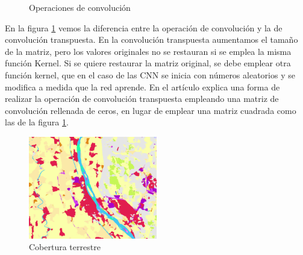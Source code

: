 \begin{figure}[H]
    \centering
    \caption{Operaciones de convolución} \label{fig:operaciones-convolucion} 
\end{figure} 

En la figura \ref{fig:operaciones-convolucion} vemos la diferencia entre la operación de convolución y la de convolución transpuesta.
En la convolución transpuesta aumentamos el tamaño de la matriz, pero los valores originales no se restauran si se emplea la misma función Kernel.
Si se quiere restaurar la matriz original, se debe emplear otra función kernel, que en el caso de las CNN se inicia con números aleatorios y se modifica a medida que la red aprende.
En el artículo \cite{ConvolucionTranspuesta} explica una forma de realizar la operación de convolución transpuesta empleando una matriz de convolución rellenada de ceros,
en lugar de emplear una matriz cuadrada como las de la figura \ref{fig:operaciones-convolucion}.

\begin{figure}[H]
    \centering
    \includegraphics[width=0.50\textwidth]{Imagenes/GeoAI/cobertura-terrestre.png}
    \caption{Cobertura terrestre} \label{fig:cobertura-terrestre}
\end{figure}

